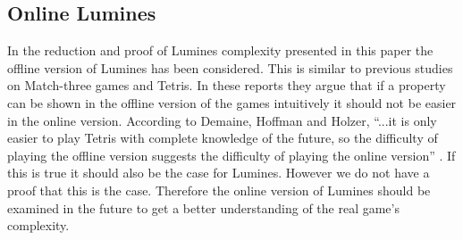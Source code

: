 \subsection{Online Lumines}

In the reduction and proof of Lumines complexity presented in this paper the offline version of Lumines has been considered. This is similar to previous studies on Match-three games and Tetris. In these reports they argue that if a property can be shown in the offline version of the games intuitively it should not be easier in the online version. According to Demaine, Hoffman and Holzer, ``...it is only easier to play Tetris with complete knowledge of the future, so the difficulty of playing the offline version suggests the difficulty of playing the online version'' \cite[p. 2]{tetris}. If this is true it should also be the case for Lumines. However we do not have a proof that this is the case. Therefore the online version of Lumines should be examined in the future to get a better understanding of the real game's complexity.

